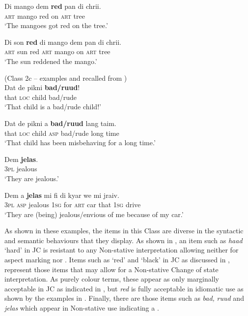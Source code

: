 \ex
\gll    Di   mango   dem \textbf{red} pan        di chrii.\\
\textsc{art} mango {\PL}         red on \textsc{art} tree\\
\glt `The mangoes got red on the tree.'

\ex
\gll     Di son \textbf{red}        di   mango dem  pan         di chrii.\\
\textsc{art} sun        red \textsc{art} mango {\PL} on \textsc{art} tree\\
\glt `The sun reddened the mango.'
\z
 \z
 
\ea%
\label{ex:6:8}
(Class 2c -- examples  and  recalled from )\\
\ea
\gll Dat           de   pikni \textbf{bad/ruud}!\\
     that \textsc{loc} child           bad/rude\\
\glt `That child is a bad\slash rude child!'

\ex
\gll Dat           de pikni           a \textbf{bad/ruud} lang taim.\\
     that \textsc{loc} child \textsc{asp}        bad/rude long time\\
\glt `That child has been misbehaving for a long time.'
\z
\z 

\ea%
\label{ex:6:9}
\ea
\gll     Dem \textbf{jelas}.\\
 \textsc{3pl}        jealous \\
\glt `They are jealous.'

\ex
\gll      Dem         a \textbf{jelas}          mi  fi         di    kyar we          mi jraiv.\\ 
 \textsc{3pl} \textsc{asp}      jealous \textsc{1sg} for \textsc{art} car that  \textsc{1sg} drive\\
\glt `They are (being) jealous\slash envious of me because of my car.'
\z
\z

As shown in these examples, the items in this Class are diverse in the syntactic and semantic behaviours that they display. As shown in , an item such as \textit{haad} `hard' in JC is resistant to any Non-stative interpretation allowing neither for  aspect marking nor . Items such as `red’ and `black' in JC as discussed in , represent those items that may allow for a Non-stative Change of state interpretation. As purely colour terms, these appear as only marginally acceptable in JC as indicated in , but \textit{red} is fully acceptable in idiomatic use as shown by the examples in . Finally, there are those items such as \textit{bad,} \textit{ruud} and \textit{jelas} which appear in Non-stative use indicating a . 

